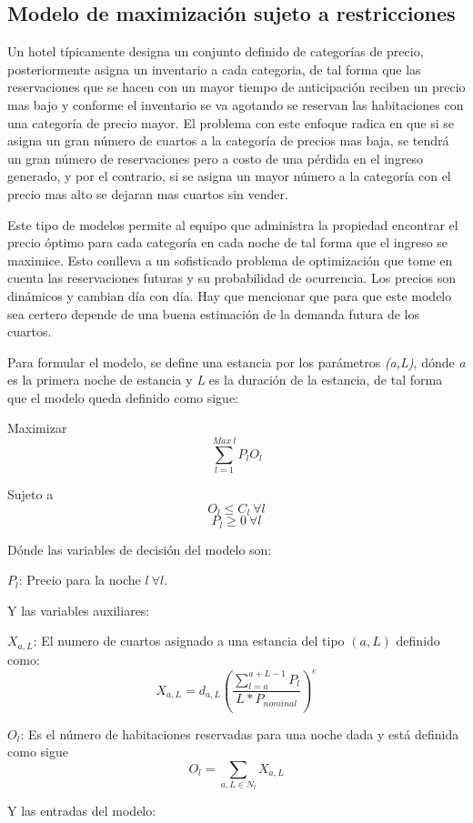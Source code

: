{{{\subsection*{Modelo de maximización sujeto a restricciones}

Un hotel típicamente designa un conjunto definido de categorías de precio, posteriormente asigna un inventario a cada categoria, de tal forma que las reservaciones que se hacen con un mayor tiempo de anticipación reciben un precio mas bajo y conforme el inventario se va agotando se reservan las habitaciones con una categoría de precio mayor. El problema con este enfoque radica en que si se asigna un gran número de cuartos a la categoría de precios mas baja, se tendrá un gran número de reservaciones pero a costo de una pérdida en el ingreso generado, y por el contrario, si se asigna un mayor número a la categoría con el precio mas alto se dejaran mas cuartos sin vender.

Este tipo de modelos permite al equipo que administra la propiedad encontrar el precio óptimo para cada categoría en cada noche de tal forma que el ingreso se maximice. Esto conlleva a un sofisticado problema de optimización que tome en cuenta las reservaciones futuras y su probabilidad de ocurrencia. Los precios son dinámicos y cambian día con día. Hay que mencionar que para que este modelo sea certero depende de una buena estimación de la demanda futura de los cuartos.

Para formular el modelo, se define una estancia por los parámetros \emph{(a,L)}, dónde \emph{a} es la primera noche de estancia y \emph{L} es la duración de la estancia, de tal forma que el modelo queda definido como sigue:

Maximizar $$\sum_{l=1}^{Max\ l} P_l O_l$$

Sujeto a $$O_l \leq C_l\  \forall l$$ $$P_l \geq 0 \ \forall l$$

Dónde las variables de decisión del modelo son:

$P_l$: Precio para la noche $l\ \forall l$.

Y las variables auxiliares:

$X_{a,L}$: El numero de cuartos asignado a una estancia del tipo $(a,L)$ definido como: $$X_{a,L} = d_{a,L}(\frac{\sum_{l=a}^{a+L-1} P_l}{L*P_{nominal}})^e$$

$O_l$: Es el número de habitaciones reservadas para una noche dada y está definida como sigue $$O_l = \sum_{a,L\in N_l} X_{a,L}$$

Y las entradas del modelo:

}}}

